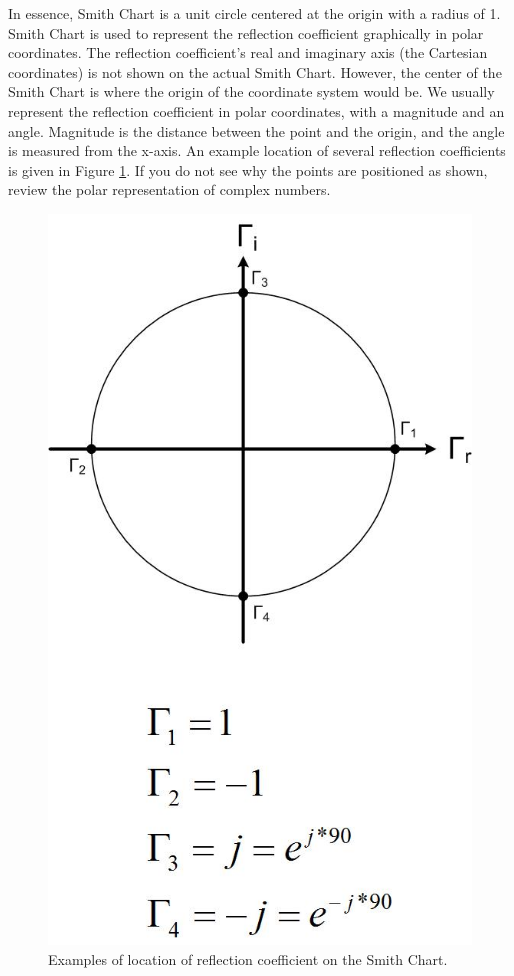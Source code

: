 \documentclass{ximera}
\begin{document}
In essence, Smith Chart is a unit circle centered at the origin with a radius of 1. Smith Chart is used to represent the reflection coefficient graphically in polar coordinates. The reflection coefficient's real and imaginary axis (the Cartesian coordinates) is not shown on the actual Smith Chart. However, the center of the Smith Chart is where the origin of the coordinate system would be. We usually represent the reflection coefficient in polar coordinates, with a
magnitude and an angle. Magnitude is the distance between the point and the origin, and the angle is measured from the x-axis. 
 An example location of several reflection coefficients is given in Figure \ref{scex}. If you do not see why the points are positioned as shown, review the polar representation of complex numbers.

\begin{figure}[htbp]
\begin{center}
\includegraphics[scale=0.3]{../jpg/Smith_Chart_Reflection_Coefficient.jpg}
\end{center}
\caption{Examples of location of reflection coefficient on the Smith Chart.}
\label{scex}
\end{figure}
\end{document}

